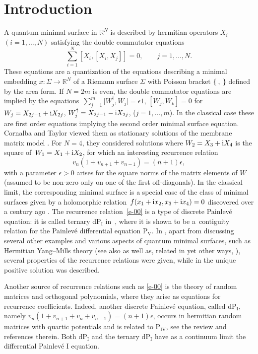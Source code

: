 \documentclass[pdftex]{sigma}
\numberwithin{equation}{section}
\theoremstyle{definition}
\begin{document}
\section{Introduction}
A quantum minimal surface \cite{Hoppe1982,Hoppe1996,IKKT1997} in $\mathbb R^N$ is described by hermitian operators $X_i$ $(i=1,\dots,N)$ satisfying the double commutator equations
\[
\sum_{i=1}^N[X_i,[X_i,X_j]]=0, \qquad j=1,\dots,N.
\]
These equations are a quantization of the equations  describing a minimal embedding $x\colon\Sigma\to \mathbb R^N$ of a Riemann surface $\Sigma$ with Poisson bracket $\{\ ,\ \}$ defined by the area form. If $N=2m$ is even, the double commutator equations are implied by the equations~${\sum_{j=1}^m\big[W_j^\dagger,W_j\big]=\epsilon 1}$, $[W_j,W_k]=0$ for $W_j=X_{2j-1}+{\rm i}X_{2j}$, $W_j^\dagger=X_{2j-1}-{\rm i}X_{2j}$, ($j=1,\dots,m$). In the classical case these are first order equations implying the second order minimal surface equation. Cornalba and Taylor \cite{CornalbaTaylor1999} viewed them as stationary solutions of the membrane matrix model \cite{Hoppe1982}. For $N=4$, they considered solutions where $W_2=X_3 + {\rm i} X_4$ is the square of~${W_1=X_1 +{\rm i} X_2}$, for which an interesting recurrence relation
\begin{equation}\label{e-00}
v_n(1+v_{n+1}+v_{n-1})=(n+1)\epsilon,
\end{equation}
with a parameter $\epsilon>0$ arises for the square norms of the matrix elements of $W$ (assumed to be non-zero only on one of the first off-diagonals). In the classical limit, the corresponding minimal surface is a special case of the class of minimal surfaces given by a holomorphic relation~${f(x_1+{\rm i}x_2,x_3+{\rm i}x_4)=0}$ discovered over a century ago \cite{Eisenhart1912,Kommerell1905}. The recurrence relation~\eqref{e-00} is a type of discrete Painlev\'e equation: it is called ternary dP${}_{\mathrm{I}}$ in~\cite{Tokihiro2002}, where it is shown to be a~contiguity relation for the Painlev\'e differential equation P${}_{\mathrm V}$.
In \cite{AHK2019}, apart from discussing several other examples and various aspects of quantum minimal surfaces, such as Hermitian Yang--Mills theory (see also \cite{Connes2002, Herscovich2011} as well as, related in yet other ways, \cite{ACH2016,AHH2012}), several properties of the recurrence relations were given, while in \cite{CDHM2025,Hoppe2025}
the unique positive solution was described.

Another source of recurrence relations such as \eqref{e-00} is the theory of random matrices and orthogonal polynomials, where they arise as equations for recurrence coefficients. Indeed, another discrete Painlev\'e equation, called dP{}$_{\mathrm I}$, namely
$v_n(1+v_{n+1}+v_n+v_{n-1})=(n+1)\epsilon$,
occurs in hermitian random matrices with quartic potentials and is related to P${}_{\mathrm{IV}}$, see the review \cite{Its2011} and references therein. Both dP{}$_{\mathrm I}$ and the ternary dP{}$_{\mathrm I}$ have as a continuum limit the differential Painlev\'e I equation.
\end{document}
